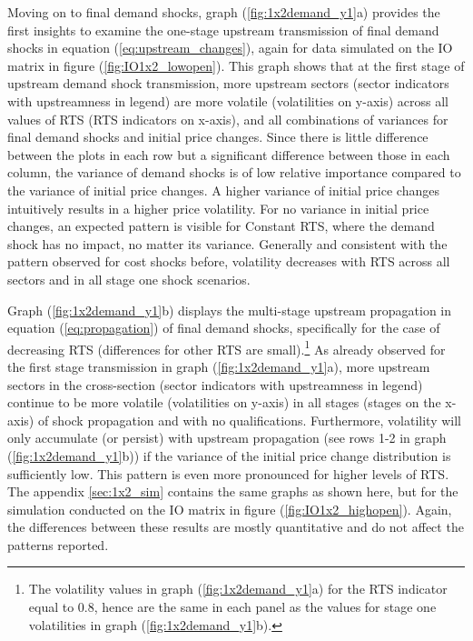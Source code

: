 Moving on to final demand shocks, graph (\ref{fig:1x2demand_y1}a) provides the first insights to examine the one-stage upstream transmission
of final demand shocks in equation (\ref{eq:upstream_changes}), again for data simulated on the IO matrix in figure (\ref{fig:IO1x2_lowopen}).
This graph shows that at the first stage of upstream demand shock transmission, more upstream sectors (sector indicators with upstreamness in 
legend) are more volatile (volatilities on y-axis) across all values of RTS (RTS indicators on x-axis), and all combinations of variances for 
final demand shocks and initial price changes. Since there is little difference between the plots in each row but a significant difference 
between those in each column, the variance of demand shocks is of low relative importance compared to the variance of initial price changes.
A higher variance of initial price changes intuitively results in a higher price volatility. For no variance in initial price changes, 
an expected pattern is visible for Constant RTS, where the demand shock has no impact, no matter its variance. Generally and consistent
with the pattern observed for cost shocks before, volatility decreases with RTS across all sectors and in all stage one shock 
scenarios. 

Graph (\ref{fig:1x2demand_y1}b) displays the multi-stage upstream propagation in equation (\ref{eq:propagation}) of final demand shocks, 
specifically for the case of decreasing RTS (differences for other RTS are small).\footnote{The volatility values in graph (\ref{fig:1x2demand_y1}a) 
for the RTS indicator equal to 0.8, hence are the same in each panel as the values for stage one volatilities in graph (\ref{fig:1x2demand_y1}b).}
As already observed for the first stage transmission in graph (\ref{fig:1x2demand_y1}a), more upstream sectors in the cross-section (sector indicators 
with upstreamness in legend) continue to be more volatile (volatilities on y-axis) in all stages (stages on the x-axis) of shock propagation and with 
no qualifications. Furthermore, volatility will only accumulate (or persist) with upstream propagation (see rows 1-2 in graph 
(\ref{fig:1x2demand_y1}b)) if the variance of the initial price change distribution is sufficiently low. This pattern is even more pronounced 
for higher levels of RTS. The appendix \ref{sec:1x2_sim} contains the same graphs as shown here, but for the simulation conducted on the IO matrix in figure 
(\ref{fig:IO1x2_highopen}). Again, the differences between these results are mostly quantitative and do not affect the patterns reported.

